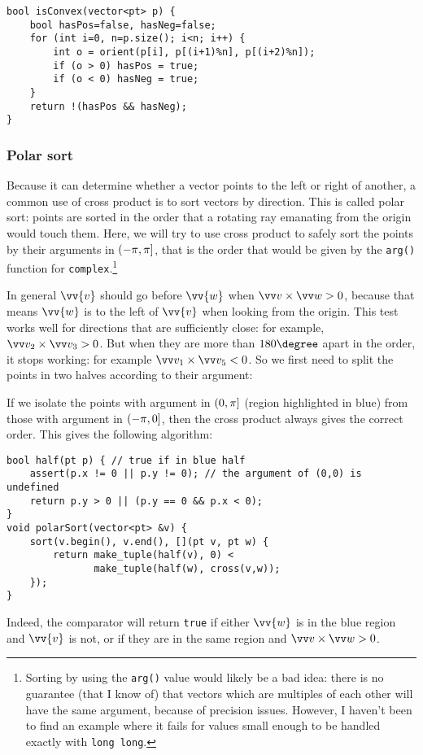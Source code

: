 
\begin{lstlisting}
bool isConvex(vector<pt> p) {
    bool hasPos=false, hasNeg=false;
    for (int i=0, n=p.size(); i<n; i++) {
        int o = orient(p[i], p[(i+1)%n], p[(i+2)%n]);
        if (o > 0) hasPos = true;
        if (o < 0) hasNeg = true;
    }
    return !(hasPos && hasNeg);
}
\end{lstlisting}

\subsubsection{Polar sort}\label{polar-sort}
Because it can determine whether a vector points to the left or right of another, a common use of cross product is to sort vectors by direction. This is called polar sort: points are sorted in the order that a rotating ray emanating from the origin would touch them. Here, we will try to use cross product to safely sort the points by their arguments in $(-\pi,\pi]$, that is the order that would be given by the \lstinline|arg()| function for \lstinline|complex|.\footnote{Sorting by using the \lstinline|arg()| value would likely be a bad idea: there is no guarantee (that I know of) that vectors which are multiples of each other will have the same argument, because of precision issues. However, I haven't been to find an example where it fails for values small enough to be handled exactly with \lstinline|long long|.}


In general $\vv{v}$ should go before $\vv{w}$ when $\crossv{v}{w} > 0$, because that means $\vv{w}$ is to the left of $\vv{v}$ when looking from the origin. This test works well for directions that are sufficiently close: for example, $\crossv{v_2}{v_3} > 0$. But when they are more than $180\degree$ apart in the order, it stops working: for example $\crossv{v_1}{v_5} < 0$. So we first need to split the points in two halves according to their argument:


If we isolate the points with argument in $(0,\pi]$ (region highlighted in blue) from those with argument in $(-\pi, 0]$, then the cross product always gives the correct order.
This gives the following algorithm:
\begin{lstlisting}
bool half(pt p) { // true if in blue half
    assert(p.x != 0 || p.y != 0); // the argument of (0,0) is undefined
    return p.y > 0 || (p.y == 0 && p.x < 0);
}
void polarSort(vector<pt> &v) {
    sort(v.begin(), v.end(), [](pt v, pt w) {
        return make_tuple(half(v), 0) <
               make_tuple(half(w), cross(v,w));
    });
}
\end{lstlisting}
Indeed, the comparator will return \lstinline|true| if either $\vv{w}$ is in the blue region and $\vv{v}$ is not, or if they are in the same region and $\crossv{v}{w} > 0$.

